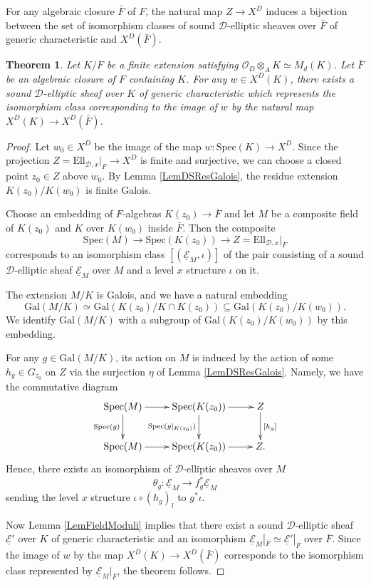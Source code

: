 \documentclass[10pt]{amsart}
\theoremstyle{plain}
\newtheorem{thm}{Theorem}[section]
\theoremstyle{definition}
\newcommand{\Gal}{\mathrm{Gal}}
\newcommand{\Spec}{\mathrm{Spec}}
\newcommand{\cO}{\mathcal{O}}
\newcommand{\Ell}{\mathrm{Ell}}
\newcommand{\ucE}{\underline{\mathcal{E}}}
\newcommand{\sD}{\mathscr{D}}
\begin{document}
For any algebraic closure $\bar{F}$ of $F$, the natural map $Z\to X^D$ induces a bijection between 
the set of isomorphism classes of sound $\sD$-elliptic sheaves over $\bar{F}$ of generic characteristic and $X^D(\bar{F})$.

\begin{thm}\label{ThmDefField}
	Let $K/F$ be a finite extension satisfying $\cO_D\otimes_A K\simeq M_d(K)$. Let $\bar{F}$ be an algebraic closure of $F$ containing $K$.
	For any $w\in X^D(K)$, there exists a sound $\sD$-elliptic sheaf over $K$ of generic characteristic which represents the isomorphism class corresponding
	to the image of $w$ by the natural map $X^D(K)\to X^D(\bar{F})$.
\end{thm}
\begin{proof}
	Let $w_0\in X^D$ be the image of the map $w:\Spec(K)\to X^D$.
	Since the projection $Z=\Ell_{\sD,x}|_F\to X^D$ is finite and surjective, we can choose 
	a closed point $z_0\in Z$ above $w_0$.
	By Lemma \ref{LemDSResGalois}, the residue extension $K(z_0)/K(w_0)$ is finite Galois.
	
	Choose an embedding of $F$-algebras $K(z_0)\to \bar{F}$ and let $M$ be a composite field of $K(z_0)$ and $K$ over $K(w_0)$ inside $\bar{F}$. Then the 
	composite 
	\[
	\Spec(M)\to \Spec(K(z_0))\to Z=\Ell_{\sD,x}|_F
	\] 
	corresponds to an isomorphism class $[(\ucE_M,\iota)]$ of the pair consisting of a sound $\sD$-elliptic sheaf $\ucE_M$ over $M$ and
	a level $x$ structure $\iota$ on it.
	
	The extension $M/K$ is Galois, and we have a natural embedding
	\begin{equation*}
		\Gal(M/K)\simeq \Gal(K(z_0)/K\cap K(z_0))\subseteq \Gal(K(z_0)/K(w_0)).
	\end{equation*}
	We identify $\Gal(M/K)$ with a subgroup of $\Gal(K(z_0)/K(w_0))$ by this embedding.
	
	
	For any $g\in \Gal(M/K)$, its action on $M$ is induced by the action of some $h_g\in G_{z_0}$ on $Z$
	via the surjection $\eta$ of Lemma \ref{LemDSResGalois}. 
	Namely, we have the commutative diagram
	\[
	\xymatrix{
		\Spec(M)\ar[r]\ar[d]_{\Spec(g)} & \Spec(K(z_0))\ar[r]\ar[d]_{\Spec(g|_{K(z_0)})} & Z \ar[d]^{[h_g]}\\
		\Spec(M)\ar[r] & \Spec(K(z_0))\ar[r] & Z.
	}
	\]
	Hence, there exists an isomorphism of $\sD$-elliptic sheaves over $M$
	\[
	\theta_g: \ucE_M\to f_g^*\ucE_M 
	\]
	sending the level $x$ structure $\iota\circ (h_g)_l$ to $g^* \iota$.
	
	Now Lemma \ref{LemFieldModuli} implies that there exist a sound $\sD$-elliptic sheaf $\ucE'$ over $K$ of generic characteristic and an isomorphism $\ucE_M|
	_{\bar{F}}\simeq \ucE'|_{\bar{F}}$ over $\bar{F}$.
	Since the image of $w$ by the map $X^D(K)\to X^D(\bar{F})$ corresponds to the isomorphism class represented by $\ucE_M|_{\bar{F}}$, the theorem follows.
\end{proof}
\end{document}
